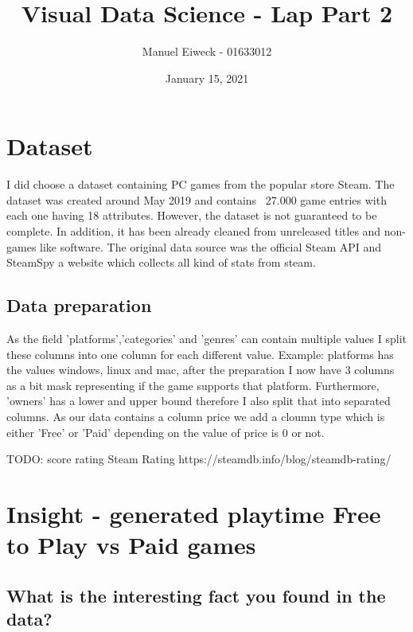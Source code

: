 \documentclass[11pt]{article}
\title{Visual Data Science - Lap Part 2}
\author{Manuel Eiweck - 01633012}
\date{January 15, 2021}
\begin{document}
\maketitle


\section{Dataset}

I did choose a dataset containing PC games from the popular store Steam. The dataset was created around May 2019 and contains ~27.000 game entries with each one having 18 attributes.
However, the dataset is not guaranteed to be complete. In addition, it has been already cleaned from unreleased titles and non-games like software. The original data source was the official Steam API and SteamSpy a website which collects all kind of stats from steam.

\subsection{Data preparation}

As the field 'platforms','categories' and 'genres' can contain multiple values I split these columns into one column for each different value. Example: platforms has the values windows, linux and mac, after the preparation I now have 3 columns as a bit mask representing if the game supports that platform. Furthermore, 'owners' has a lower and upper bound therefore I also split that into separated columns. As our data contains a column price we add a cloumn type which is either 'Free' or 'Paid' depending on the value of price is 0 or not.

TODO: score rating
Steam Rating
https://steamdb.info/blog/steamdb-rating/

\section{Insight - generated playtime Free to Play vs Paid games}

\subsection{What is the interesting fact you found in the data?}
\end{document}
